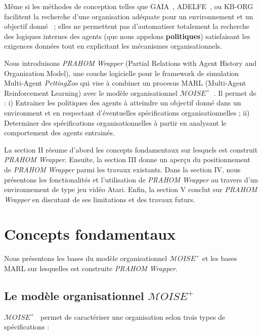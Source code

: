 \documentclass[demonstration]{jfsma}
\begin{document}
Même si les méthodes de conception telles que GAIA~\cite{Wooldridge2000,Cernuzzi2014}, ADELFE~\cite{Mefteh2015},
ou KB-ORG~\cite{Sims2008} facilitent la recherche d'une organisation adéquate pour un environnement et un objectif donné~\cite{Mefteh2013} ; elles ne permettent pas d'automatiser totalement la recherche des logiques internes des agents (que nous appelons \textbf{politiques}) satisfaisant les exigences données tout en explicitant les mécanismes organisationnels.

Nous introduisons \emph{PRAHOM Wrapper} (Partial Relations with Agent History and Organization Model), une couche logicielle pour le framework de simulation Multi-Agent \emph{PettingZoo} qui vise à combiner un procesus MARL (Multi-Agent Reinforcement Learning) avec le modèle organisationnel $\mathcal{M}OISE^+$~\cite{Hubner2007}. Il permet de :
%
i) Entrainer les politiques des agents à atteindre un objectif donné dans un environment et en respectant d'éventuelles spécifications organisationnelles ;\quad
ii) Determiner des spécifications organisationnelles à partir en analysant le comportement des agents entrainés.

La section II résume d'abord les concepts fondamentaux sur lesquels est construit \emph{PRAHOM Wrapper}.
Ensuite, la section III donne un aperçu du positionnement de \emph{PRAHOM Wrapper} parmi les travaux existants.
Dans la section IV, nous présentons les fonctionalités et l'utilisation de \emph{PRAHOM Wrapper} au travers d'un environnement de type jeu vidéo Atari. Enfin, la section V conclut sur \emph{PRAHOM Wrapper} en discutant de ses limitations et des travaux futurs.


\section{Concepts fondamentaux}

Nous présentons les bases du modèle organisationnel $\mathcal{M}OISE^+$ et les bases MARL sur lesquelles est construite \emph{PRAHOM Wrapper}.

\subsection{Le modèle organisationnel $\mathcal{M}OISE^+$}

$\mathcal{M}OISE^+$~\cite{Hubner2007} permet de caractériser une organisation selon trois types de spécifications :
\end{document}
